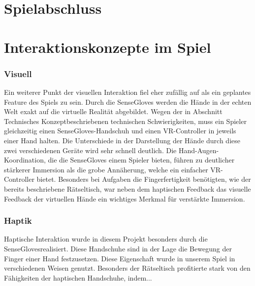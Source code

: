 \section{Spielabschluss}

\newpage
\noindent
\section{Interaktionskonzepte im Spiel}
\subsubsection{Visuell}
Ein weiterer Punkt der visuellen Interaktion fiel eher zufällig auf als ein geplantes Feature des Spiels zu sein. Durch die SenseGloves werden die Hände in der echten Welt exakt auf die virtuelle Realität abgebildet. Wegen der in Abschnitt \dq Technisches Konzept\dq beschriebenen technischen Schwierigkeiten, muss ein Spieler gleichzeitig einen SenseGloves-Handschuh und einen VR-Controller in jeweils einer Hand halten. Die Unterschiede in der Darstellung der Hände durch diese zwei verschiedenen Geräte wird sehr schnell deutlich. Die Hand-Augen-Koordination, die die SenseGloves einem Spieler bieten, führen zu deutlicher stärkerer Immersion als die grobe Annäherung, welche ein einfacher VR-Controller bietet. Besonders bei Aufgaben die Fingerfertigkeit benötigten, wie der bereits beschriebene Rätseltisch, war neben dem haptischen Feedback das visuelle Feedback der virtuellen Hände ein wichtiges Merkmal für verstärkte Immersion.
\subsubsection{Haptik}
Haptische Interaktion wurde in diesem Projekt besonders durch die \dq SenseGloves\dq realisiert. Diese Handschuhe sind in der Lage die Bewegung der Finger einer Hand festzusetzen. Diese Eigenschaft wurde in unserem Spiel in verschiedenen Weisen genutzt. Besonders der Rätseltisch profitierte stark von den Fähigkeiten der haptischen Handschuhe, indem...\\
